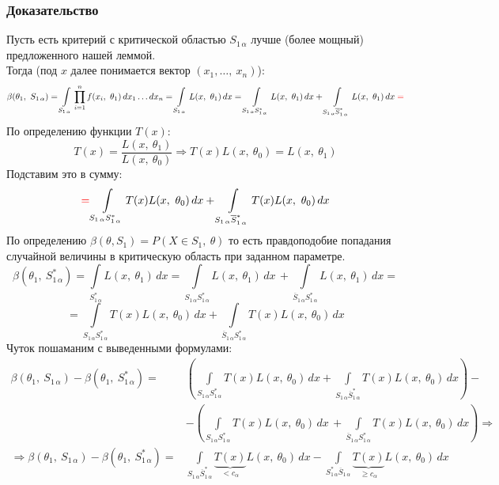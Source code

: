 \documentclass[12pt, a4paper]{article}
\begin{document}
\subsubsection*{Доказательство}
Пусть есть критерий с критической областью $S_{1\, \alpha}$ лучше (более мощный) предложенного нашей леммой.\\
Тогда (под $x$ далее понимается вектор $(x_1,\dots,\ x_n)$):
\[\beta (\theta_1,\ S_{1\, \alpha}) = \int\limits_{S_{1\, \alpha}} \prod_{i = 1}^{n} f(x_i,\ \theta_1)\, dx_1\dots dx_n = \int\limits_{S_{1\, \alpha}} L(x,\ \theta_1)\, dx = \int\limits_{S_{1\,\alpha}S^*_{1\,\alpha}} L(x,\ \theta_1)\, dx + \int\limits_{S_{1\, \alpha} \overline{S}^*_{1\, \alpha}} L(x,\ \theta_1)\, dx \color{red}=\]
По определению функции $T(x)$:
\[T(x) = \frac{L(x,\ \theta_1)}{L(x,\ \theta_0)}\Rightarrow T(x)L(x,\ \theta_0) = L(x,\ \theta_1)\]
Подставим это в сумму:
\[{\color{red} =} \int\limits_{S_{1\,\alpha}S^*_{1\,\alpha}} T(x) L(x,\ \theta_0)\, dx + \int\limits_{S_{1\, \alpha} \overline{S}^*_{1\, \alpha}} T(x) L(x,\ \theta_0)\, dx\]
По определению $\beta(\theta, S_1) = P\left( X \in S_1,\ \theta \right)$ то есть правдоподобие попадания случайной величины в критическую область при заданном параметре.
\[\beta (\theta_1,\ S^*_{1\, \alpha}) = \int\limits_{S^*_{1\, \alpha}} L(x,\ \theta_1)\, dx = \int\limits_{S_{1\,\alpha}S^*_{1\,\alpha}} L(x,\ \theta_1)\, dx\, + \int\limits_{\overline{S}_{1\, \alpha} S^*_{1\, \alpha}} L(x,\ \theta_1)\, dx =\]
\[=\int\limits_{S_{1\,\alpha}S^*_{1\,\alpha}} T(x) L(x,\ \theta_0)\, dx + \int\limits_{\overline{S}_{1\, \alpha} S^*_{1\, \alpha}} T(x) L(x,\ \theta_0)\, dx\]
Чуток пошаманим с выведенными формулами:
\begin{equation*}
    \begin{aligned}
        \beta\left( \theta_1,\ S_{1\, \alpha} \right) - \beta\left( \theta_1,\ S_{1\, \alpha}^* \right) =& \left( \int\limits_{S_{1\, \alpha} S_{1\, \alpha}^*} T(x) L(x,\ \theta_0)\, dx + \int\limits_{S_{1\, \alpha} \overline{S}_{1\, \alpha}^*} T(x)L(x,\ \theta_0)\, dx \right) -\\
        &- \left( \int\limits_{S_{1\, \alpha}S_{1\, \alpha}^*} T(x)L(x,\ \theta_0)\, dx\, + \int\limits_{\overline{S}_{1\, \alpha} S^*_{1\, \alpha}} T(x)L(x,\ \theta_0)\, dx \right) \Rightarrow\\
        \Rightarrow\beta\left( \theta_1,\ S_{1\, \alpha} \right) - \beta\left( \theta_1,\ S_{1\, \alpha}^* \right)=&\int\limits_{S_{1\, \alpha} \overline{S}^*_{1\, \alpha}} \underset{< c_{\alpha}}{\underbrace{T(x)}} L(x,\ \theta_0)\, dx - \int\limits_{S^*_{1\, \alpha} \overline{S}_{1\, \alpha}} \underset{\geq c_{\alpha}}{\underbrace{T(x)}} L(x,\ \theta_0)\, dx
    \end{aligned}
\end{equation*}
\end{document}
